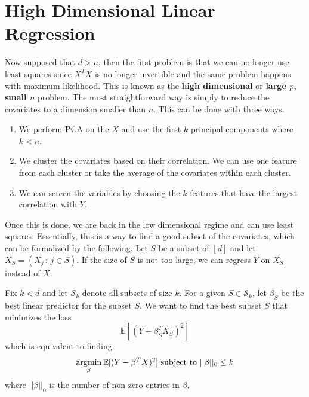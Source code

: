 \section{High Dimensional Linear Regression}

    Now supposed that $d > n$, then the first problem is that we can no longer use least squares since $X^T X$ is no longer invertible and the same problem happens with maximum likelihood. This is known as the \textbf{high dimensional} or \textbf{large $p$, small $n$} problem. The most straightforward way is simply to reduce the covariates to a dimension smaller than $n$. This can be done with three ways. 
    \begin{enumerate}
      \item We perform PCA on the $X$ and use the first $k$ principal components where $k < n$. 
      \item We cluster the covariates based on their correlation. We can use one feature from each cluster or take the average of the covariates within each cluster. 
      \item We can screen the variables by choosing the $k$ features that have the largest correlation with $Y$. 
    \end{enumerate}
    Once this is done, we are back in the low dimensional regime and can use least squares. Essentially, this is a way to find a good subset of the covariates, which can be formalized by the following. Let $S$ be a subset of $[d]$ and let $X_S = (X_j \,:\, j \in S)$. If the size of $S$ is not too large, we can regress $Y$ on $X_S$ instead of $X$. 

    \begin{definition}
      Fix $k < d$ and let $\mathcal{S}_k$ denote all subsets of size $k$. For a given $S \in \mathcal{S}_k$, let $\beta_S$ be the best linear predictor for the subset $S$. We want to find the best subset $S$ that minimizes the loss 
      \begin{equation}
        \mathbb{E} [ (Y - \beta_S^T X_S)^2] 
      \end{equation}
      which is equivalent to finding 
      \begin{equation}
        \argmin_{\beta} \mathbb{E} [ (Y - \beta^T X)^2] \text{ subject to } ||\beta||_0 \leq k
      \end{equation}
      where $||\beta||_0$ is the number of non-zero entries in $\beta$. 
    \end{definition}

